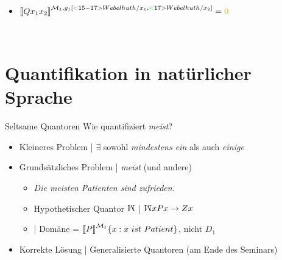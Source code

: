 \begin{frame}
\begin{minipage}{0.5\textwidth}
\begin{itemize}[<+->]
\begin{itemize}[<+->]
            \item $\dem{Qx_1x_2}^{\mMm_1,g_1[\tuerkis<15-17>{Webelhuth/x_1},\gruen<17>{Webelhuth/x_2}]}=\orongsch{0}$
          \end{itemize}
    \end{itemize}\end{minipage}%
    \begin{minipage}{0.5\textwidth}%
    \centering 
    \\
  \end{minipage}
\end{frame}

\section{Quantifikation in natürlicher Sprache}

\begin{frame}
  {Seltsame Quantoren}
  \onslide<+->
  \onslide<+->
  Wie quantifiziert \textit{meist}?\\
  \Halbzeile
  \begin{itemize}[<+->]
    \item Kleineres Problem | $\exists$ sowohl \textit{mindestens ein} als auch \textit{einige}
      \Halbzeile
    \item Grundsätzliches Problem | \textit{meist} (und andere)
      \begin{itemize}[<+->]
        \item[ ] \textit{Die meisten Patienten sind zufrieden.}
        \item Hypothetischer Quantor \alert{$\rotatebox[origin=c]{180}{M}$} | \alert{$\rotatebox[origin=c]{180}{M}xPx\rightarrow Zx$}\\
        \item {}| Domäne = $\dem{P}^{\Model_1}\{x:x\ ist\ Patient\}$, nicht $D_1$
      \end{itemize}
      \Halbzeile
    \item Korrekte Lösung | \alert{Generalisierte Quantoren} (am Ende des Seminars)
  \end{itemize}
\end{frame}

